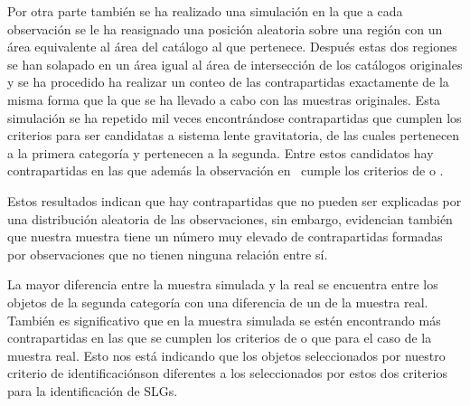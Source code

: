 Por otra parte también se ha realizado una simulación en la que a cada observación se le ha reasignado una posición aleatoria sobre una región con un área equivalente al área del catálogo al que pertenece. Después estas dos regiones se han solapado en un área igual al área de intersección de los catálogos originales y se ha procedido ha realizar un conteo de las contrapartidas exactamente de la misma forma que la que se ha llevado a cabo con las muestras originales. Esta simulación se ha repetido mil veces encontrándose  contrapartidas que cumplen los criterios para ser candidatas a sistema lente gravitatoria, de las cuales  pertenecen a la primera categoría y  pertenecen a la segunda. Entre estos candidatos hay  contrapartidas en las que además la observación en \hatlas\ cumple los criterios de \cite{article:Nuevo_2012} o \cite{article:Negrello_2010}.

Estos resultados indican que hay  contrapartidas que no pueden ser explicadas por una distribución aleatoria de las observaciones, sin embargo, evidencian también que nuestra muestra tiene un número muy elevado de contrapartidas formadas por observaciones que no tienen ninguna relación entre sí. 

La mayor diferencia entre la muestra simulada y la real se encuentra entre los objetos de la segunda categoría con una diferencia de un  de la muestra real. También es significativo que en la muestra simulada se estén encontrando más contrapartidas en las que se cumplen los criterios de \cite{article:Nuevo_2012} o \cite{article:Negrello_2010} que para el caso de la muestra real. Esto nos está indicando que los objetos seleccionados por nuestro criterio de identificación\linebreak son diferentes a los seleccionados por estos dos criterios para la identificación de SLGs.

